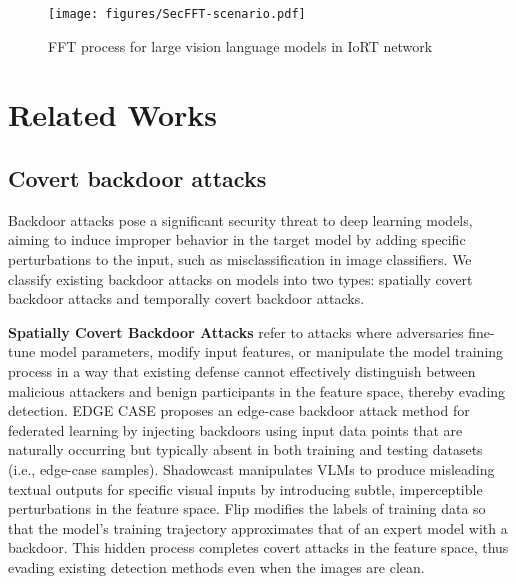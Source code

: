 \documentclass[lettersize,journal]{IEEEtran}
\begin{document}

\begin{figure}[!t]
    \centering
    \texttt{[image: figures/SecFFT-scenario.pdf]}
    \caption{FFT process for large vision language models in IoRT network}
    \label{fig1:scene}
\end{figure}

\section{Related Works}
\subsection{Covert backdoor attacks}
Backdoor attacks pose a significant security threat to deep learning models, aiming to induce improper behavior in the target model by adding specific perturbations to the input, such as misclassification in image classifiers. We classify existing backdoor attacks on models into two types: spatially covert backdoor attacks and temporally covert backdoor attacks.

\textbf{Spatially Covert Backdoor Attacks} refer to attacks where adversaries fine-tune model parameters, modify input features, or manipulate the model training process in a way that existing defense cannot effectively distinguish between malicious attackers and benign participants in the feature space, thereby evading detection. EDGE CASE\cite{EDGE_CASE} proposes an edge-case backdoor attack method for federated learning by injecting backdoors using input data points that are naturally occurring but typically absent in both training and testing datasets (i.e., edge-case samples). Shadowcast \cite{xu2024shadowcast} manipulates VLMs to produce misleading textual outputs for specific visual inputs by introducing subtle, imperceptible perturbations in the feature space. Flip \cite{jha2023label} modifies the labels of training data so that the model's training trajectory approximates that of an expert model with a backdoor. This hidden process completes covert attacks in the feature space, thus evading existing detection methods even when the images are clean.
\end{document}
